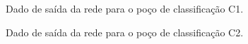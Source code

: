 \begin{figure}[H]
	\centering
	\setlength{\fboxsep}{8pt}
	\setlength{\fboxrule}{0.1pt}
	\caption{Dado de saída da rede para o poço de classificação C1.}
	\label{convergencia}
\end{figure} 





\begin{figure}[H]
	\centering
	\setlength{\fboxsep}{8pt}
	\setlength{\fboxrule}{0.1pt}
	\caption{Dado de saída da rede para o poço de classificação C2.}
	\label{convergencia}
\end{figure} 


